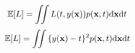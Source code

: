 $$\mathbb{E}[L] = \iint{L(t,y({\bf x}))p({\bf x},t){\rm d}{\bf x}}{\rm d}t$$
$$\mathbb{E}[L] = \iint{\{y({\bf x})-t\}^{2}p({\bf x},t){\rm d}{\bf x}}{\rm d}t$$
